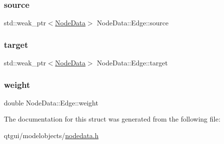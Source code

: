 \mbox{\label{struct_node_data_1_1_edge_afc79148f76a832e39aaf77ba3055aae8}} 
\subsubsection{\texorpdfstring{source}{source}}
{\footnotesize\ttfamily std\+::weak\+\_\+ptr$<$\mbox{\hyperlink{class_node_data}{Node\+Data}}$>$ Node\+Data\+::\+Edge\+::source}

\mbox{\label{struct_node_data_1_1_edge_aab7b2994ead391b9f2ccfac5decfeb1c}} 
\subsubsection{\texorpdfstring{target}{target}}
{\footnotesize\ttfamily std\+::weak\+\_\+ptr$<$\mbox{\hyperlink{class_node_data}{Node\+Data}}$>$ Node\+Data\+::\+Edge\+::target}

\mbox{\label{struct_node_data_1_1_edge_a83f11bbc9d390a4bafc7acb2dc7186f0}} 
\subsubsection{\texorpdfstring{weight}{weight}}
{\footnotesize\ttfamily double Node\+Data\+::\+Edge\+::weight}



The documentation for this struct was generated from the following file\+:\begin{DoxyCompactItemize}
\item 
qtgui/modelobjects/\mbox{\hyperlink{nodedata_8h}{nodedata.\+h}}\end{DoxyCompactItemize}
